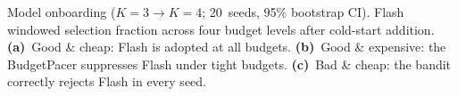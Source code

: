 Model onboarding ($K{=}3 \to K{=}4$; 20~seeds, 95\% bootstrap CI). Flash windowed selection fraction across four budget levels after cold-start addition. \textbf{(a)}~Good \& cheap: Flash is adopted at all budgets. \textbf{(b)}~Good \& expensive: the BudgetPacer suppresses Flash under tight budgets. \textbf{(c)}~Bad \& cheap: the bandit correctly rejects Flash in every seed.
